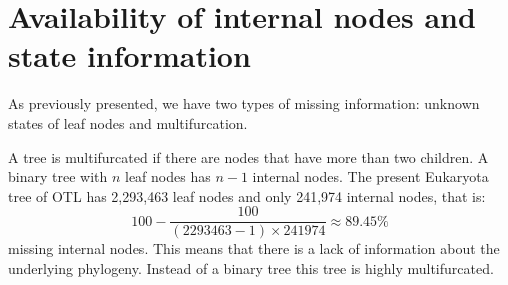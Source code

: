   \section{Availability of internal nodes and state information} \label{sec:results - missing information}
    As previously presented, we have two types of missing information: unknown states of leaf nodes 
      and multifurcation.

    A tree is multifurcated if there are nodes that have more than two children. A binary tree with 
      $n$ leaf nodes has $n-1$ internal nodes. The present Eukaryota tree of OTL has 2,293,463 leaf 
      nodes and only 241,974 internal nodes, that is:
    $$100-\frac{100}{(2293463-1) \times 241974} \approx 89.45\%$$
      missing internal nodes. This means that there is a lack of information about the underlying 
      phylogeny. Instead of a binary tree this tree is highly multifurcated.


